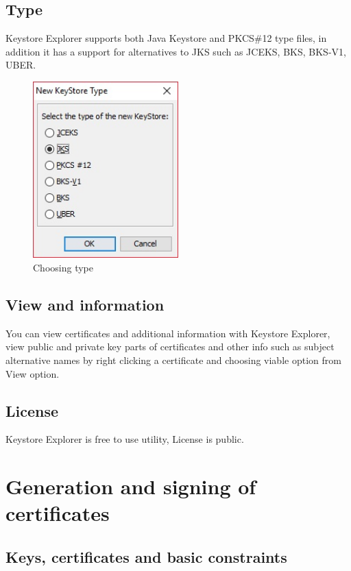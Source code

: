 \documentclass[10pt, a4paper]{report}
\begin{document}
{  \subsection{Type}
Keystore Explorer supports both Java Keystore and PKCS\#12 type files, in addition it has a support for alternatives to JKS such as JCEKS, BKS, BKS-V1, UBER.
\begin{figure}[!ht]
 \caption{Choosing type}
 \centering
  \includegraphics[width=0.5\textwidth]{../Dependancies/Keystore_Explorer/Type.jpg}
\end{figure}
  
\subsection{View and information}
You can view certificates and additional information with Keystore Explorer, view public and private key parts of certificates and other info such as subject alternative names by right clicking a certificate and choosing viable option from View option.

  \subsection{License}
Keystore Explorer is free to use utility, License is public.
  
\section{Generation and signing of certificates}

  \subsection{Keys, certificates and basic constraints}
  
}
\end{document}
